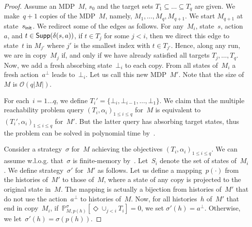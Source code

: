 \documentclass{llncs}
\newcommand{\supp}{\ensuremath{{\sf Supp}} }
\newcommand{\initState}{\ensuremath{s_{{\sf init}}} }
\newcommand*{\pr}{\mathbb{P}}
\begin{document}
\begin{proof}
  Assume an MDP~$M$, $s_0$ and the target sets $T_1 \subseteq \ldots \subseteq T_q$ are given.
  We make~$q+1$ copies of the MDP~$M$, namely, $M_1,\ldots,M_q,M_{q+1}$. We start $M_{q+1}$ at state~$\initState$.
  We redirect some of the edges as follows.
  For any~$M_i$, state~$s$, action~$a$, and $t \in \supp(\delta(s,a))$, if $t \in T_j$ for some $j<i$, then we direct this edge to state~$t$ in $M_{j'}$
  where $j'$ is the smallest index with $t \in T_{j'}$.
  Hence, along any run, we are in copy~$M_j$ if, and only if we have already satisfied all targets $T_j,\ldots,T_q$.
  Now, we add a fresh absorbing state~$\bot_i$ to each copy. From all states of~$M_i$ a fresh action~$a^\bot$ leads to~$\bot_i$.
  Let us call this new MDP~$M'$. Note that the size of~$M$ is $\mathcal{O}(q|M|)$.

  For each~$i=1\ldots q$, we define $T_i' = \{\bot_i,\bot_{i-1},\ldots,\bot_1\}$.
  We claim that the multiple reachability problem query $(T_i,\alpha_i)_{1\leq i\leq q}$ for~$M$
  is equivalent to~$(T_i',\alpha_i)_{1\leq i\leq q}$ for~$M'$. But the latter query has absorbing target states, thus the problem can be solved in polynomial time
  by~\cite{EKVY-lmcs08}.
  
  Consider a strategy~$\sigma$ for~$M$ achieving the objectives $(T_i,\alpha_i)_{1\leq i\leq q}$.
  We can assume w.l.o.g. that~$\sigma$ is finite-memory by~\cite{EKVY-lmcs08}.
  Let~$S_i$ denote the set of states of~$M_i$.
  We define strategy~$\sigma'$ for~$M'$ as follows. Let us define a mapping~$p(\cdot)$ from the histories of~$M'$ to those of~$M$, where a state of any copy
  is projected to the original state in~$M$. The mapping is actually a bijection from histories of~$M'$ that do not use the action~$a^\bot$
  to histories of~$M$.
  Now, for all histories~$h$ of~$M'$ that end in copy~$M_i$,
  if~$\pr_{M, p(h)}^\sigma[\Diamond \cup_{j <i} T_i ] = 0$, we set $\sigma'(h) = a^\bot$. Otherwise, we let~$\sigma'(h) = \sigma(p(h))$.


\end{proof}
\end{document}
